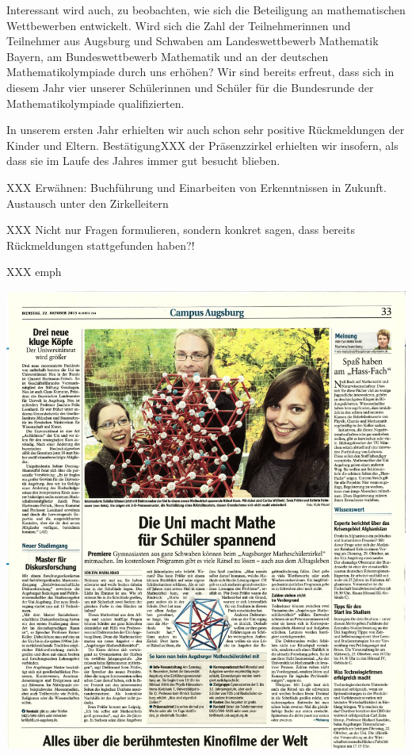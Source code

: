 \documentclass[12pt]{zettel}
\begin{document}
Interessant wird auch, zu beobachten, wie sich die Beteiligung an
mathematischen Wettbewerben entwickelt. Wird sich die Zahl der
Teilnehmerinnen und Teilnehmer aus Augsburg und Schwaben am Landeswettbewerb
Mathematik Bayern, am Bundeswettbewerb Mathematik und an der deutschen
Mathematikolympiade durch uns erhöhen? Wir sind bereits erfreut,
dass sich in diesem Jahr vier unserer Schülerinnen und Schüler für die
Bundesrunde der Mathematikolympiade qualifizierten.

In unserem ersten Jahr erhielten wir auch schon sehr positive Rückmeldungen der
Kinder und Eltern. BestätigungXXX der Präsenzzirkel erhielten wir insofern, als
dass sie im Laufe des Jahres immer gut besucht blieben.

XXX Erwähnen: Buchführung und Einarbeiten von Erkenntnissen in Zukunft.
Austausch unter den Zirkelleitern

XXX Nicht nur Fragen formulieren, sondern konkret sagen, dass bereits
Rückmeldungen stattgefunden haben?!

XXX emph





\pagestyle{empty}
\hspace{-3.5cm}\includegraphics[scale=0.62]{Augsburger-Allgemeine-2013-10-22.jpeg}


\end{document}
